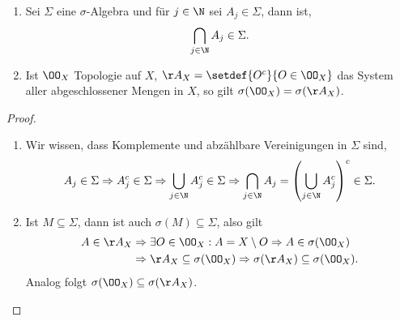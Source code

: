 \begin{cor}
\label{prop:3.5}
\begin{enumerate}[label=\arabic{*}.)]
  \item Sei $\Sigma$ eine $\sigma$-Algebra und für $j\in\N$ sei $A_j\in\Sigma$,
  dann ist,
  \begin{align*}
  \bigcap_{j\in\N} A_j \in \Sigma.
  \end{align*}
  \item Ist $\OO_X$ Topologie auf $X$, $\AA_X=\setdef{O^c}{O\in\OO_X}$ das
  System aller abgeschlossener Mengen in $X$, so gilt $\sigma(\OO_X) =
  \sigma(\AA_X)$.\fishhere
\end{enumerate}
\end{cor}
\begin{proof}
\begin{enumerate}[label=\arabic{*}.)]
  \item Wir wissen, dass Komplemente und abzählbare Vereinigungen in $\Sigma$
  sind,
  \begin{align*}
  A_j\in\Sigma \Rightarrow A_j^c \in\Sigma \Rightarrow \bigcup_{j\in\N}
  A_j^c\in\Sigma \Rightarrow \bigcap_{j\in\N} A_j = \left(\bigcup_{j\in\N}
  A_j^c\right)^c \in \Sigma.
  \end{align*}
\item Ist $M\subseteq \Sigma$, dann ist auch $\sigma(M)\subseteq\Sigma$, also
gilt
\begin{align*}
A\in\AA_X &\Rightarrow \exists O\in\OO_X : A=X\setminus O \Rightarrow
A\in\sigma(\OO_X) \\ &\Rightarrow \AA_X\subseteq \sigma(\OO_X) \Rightarrow
\sigma(\AA_X)\subseteq \sigma(\OO_X).
\end{align*}
Analog folgt $\sigma(\OO_X)\subseteq\sigma(\AA_X)$.\qedhere
\end{enumerate}
\end{proof}

